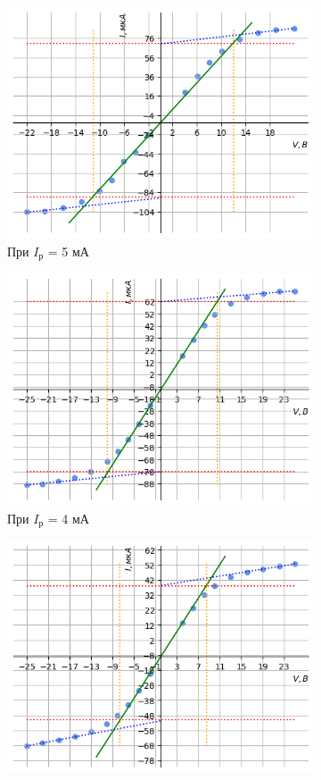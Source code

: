 \newpage

\begin{figure}[h!]
    \begin{subfigure}{0.5\linewidth}
        \centering
        \includegraphics[width=10cm]{images/plotI_5.png}
        \caption{При $I_{\text{р}}$ = 5 мА}
    \end{subfigure}
    \hfill
    \begin{subfigure}{0.5\linewidth}
        \centering
        \includegraphics[width=10cm]{images/plotI_4.png}
        \caption{При $I_{\text{р}}$ = 4 мА}
    \end{subfigure}
    \vfill
    \begin{subfigure}{0.5\linewidth}
        \centering
        \includegraphics[width=10cm]{images/plotI_3.png}

\end{subfigure}
\end{figure}
